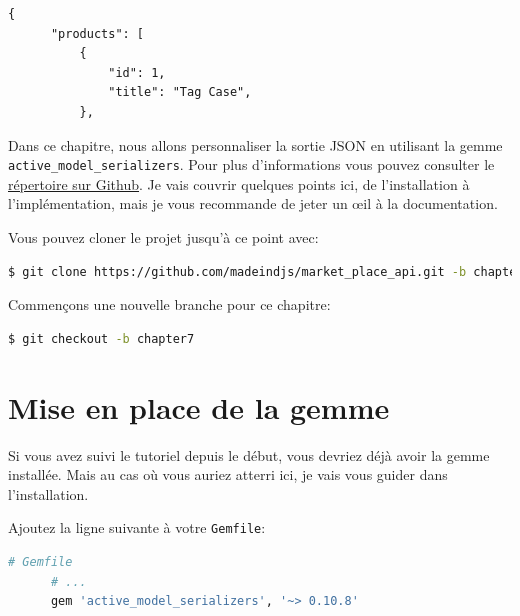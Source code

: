 \documentclass[]{report}
\begin{document}
  \begin{scriptsize}
    \begin{lstlisting}[caption={Exemple d'une belle sortie JSON pour la route products}, label={lst:wanted_products_json}]
    {
      "products": [
          {
              "id": 1,
              "title": "Tag Case",
          },
    \end{lstlisting}
  \end{scriptsize}

  Dans ce chapitre, nous allons personnaliser la sortie JSON en utilisant la gemme \verb|active_model_serializers|. Pour plus d'informations vous pouvez consulter le \href{https://github.com/rails-api/active_model_serializers}{répertoire sur Github}. Je vais couvrir quelques points ici, de l'installation à l'implémentation, mais je vous recommande de jeter un œil à la documentation.

  Vous pouvez cloner le projet jusqu'à ce point avec:

  \begin{scriptsize}
    \begin{lstlisting}[language=bash]
    $ git clone https://github.com/madeindjs/market_place_api.git -b chapter6
    \end{lstlisting}
  \end{scriptsize}

  Commençons une nouvelle branche pour ce chapitre:

  \begin{scriptsize}
    \begin{lstlisting}[language=bash]
    $ git checkout -b chapter7
    \end{lstlisting}
  \end{scriptsize}

  \section{Mise en place de la gemme}

    Si vous avez suivi le tutoriel depuis le début, vous devriez déjà avoir la gemme installée. Mais au cas où vous auriez atterri ici, je vais vous guider dans l'installation.

    Ajoutez la ligne suivante à votre \verb|Gemfile|:

    \begin{scriptsize}
      \begin{lstlisting}[language=ruby]
      # Gemfile
      # ...
      gem 'active_model_serializers', '~> 0.10.8'
      \end{lstlisting}
    \end{scriptsize}
\end{document}
